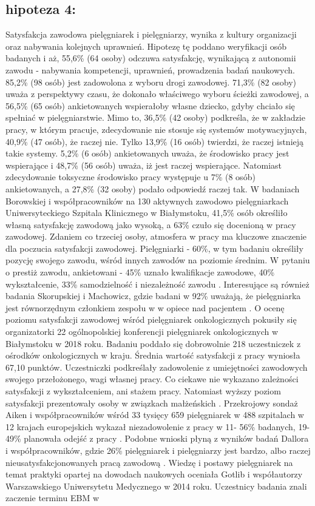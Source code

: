 \documentclass[a4paper,12pt,twoside,openany]{report}
\begin{document}
\subsection*{hipoteza 4:} 
Satysfakcja zawodowa pielęgniarek i pielęgniarzy, wynika z kultury organizacji oraz nabywania kolejnych uprawnień. Hipotezę tę poddano weryfikacji osób badanych i aż, 55,6\%  (64 osoby) odczuwa satysfakcję, wynikającą z autonomii zawodu - nabywania kompetencji, uprawnień, prowadzenia badań naukowych.   85,2\% (98 osób) jest zadowolona z wyboru drogi zawodowej. 71,3\% (82 osoby) uważa z perspektywy czasu, że dokonało właściwego wyboru ścieżki zawodowej, a 56,5\% (65 osób) ankietowanych wspierałoby własne dziecko, gdyby chciało się spełniać w pielęgniarstwie. Mimo to, 36,5\% (42 osoby) podkreśla, że w zakładzie pracy, w którym pracuje,   zdecydowanie nie stosuje się systemów motywacyjnych, 40,9\% (47 osób), że raczej nie. Tylko 13,9\% (16 osób) twierdzi, że raczej istnieją takie systemy. 5,2\% (6 osób) ankietowanych uważa, że środowisko pracy jest wspierające i 48,7\%  (56 osób)  uważa, iż jest raczej wspierające. Natomiast zdecydowanie toksyczne środowisko pracy występuje u 7\% (8 osób) ankietowanych, a 27,8\%  (32 osoby) podało odpowiedź raczej tak. W badaniach  Borowskiej i współpracowników na 130 aktywnych zawodowo pielęgniarkach Uniwersyteckiego Szpitala Klinicznego w Białymstoku, 41,5\% osób określiło własną satysfakcję zawodową jako wysoką, a 63\% czuło się docenioną w pracy zawodowej. Zdaniem co trzeciej osoby, atmosfera w pracy ma kluczowe znaczenie dla poczucia satysfakcji zawodowej. Pielęgniarki - 60\%, w tym badaniu określiły  pozycję swojego zawodu, wśród innych zawodów na poziomie średnim. W pytaniu o prestiż zawodu, ankietowani - 45\% uznało kwalifikacje zawodowe, 40\% wykształcenie, 33\% samodzielność i niezależność zawodu \cite{zbiorowa}. Interesujące są również badania Skorupskiej  i Machowicz, gdzie badani w 92\% uważają, że pielęgniarka jest równorzędnym członkiem zespołu w w opiece nad pacjentem \cite{skorupska}. O ocenę poziomu satysfakcji zawodowej wśród pielęgniarek onkologicznych pokusiły się organizatorki 22 ogólnopolskiej konferencji pielęgniarek onkologicznych w Białymstoku w 2018 roku. Badaniu poddało się dobrowolnie 218 uczestniczek z ośrodków onkologicznych w kraju. Średnia wartość satysfakcji z pracy wyniosła 67,10 punktów. Uczestniczki podkreślały zadowolenie z umiejętności zawodowych swojego przełożonego, wagi własnej pracy. Co ciekawe nie wykazano zależności satysfakcji z wykształceniem, ani stażem pracy. Natomiast wyższy poziom satysfakcji prezentowały osoby w związkach małżeńskich \cite{onkologiczne}. Przekrojowy sondaż Aiken i współpracowników wśród  33 tysięcy 659 pielęgniarek w 488 szpitalach w 12 krajach europejskich wykazał niezadowolenie z pracy  w 11- 56\% badanych, 19-49\% planowała odejść z pracy \cite{termedia}. Podobne wnioski płyną z wyników badań Dallora  i współpracowników, gdzie 26\% pielęgniarek i pielęgniarzy jest bardzo, albo raczej nieusatysfakcjonowanych pracą zawodową \cite{dalora}. Wiedzę i postawy pielęgniarek na temat praktyki opartej na dowodach naukowych oceniała Gotlib i współautorzy Warszawskiego Uniwersytetu Medycznego w 2014 roku. Uczestnicy badania znali zaczenie terminu EBM w 
\end{document}
